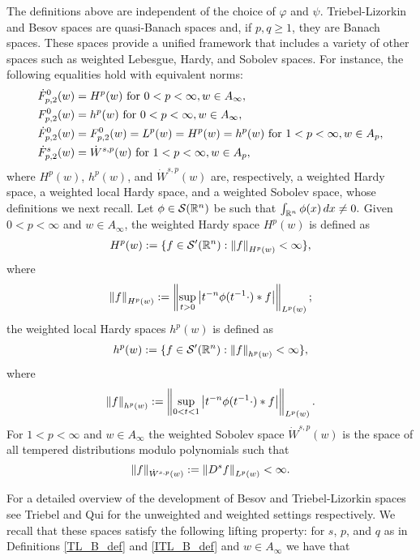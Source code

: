 The definitions above are independent of the choice of $\varphi$ and $\psi$. Triebel-Lizorkin and Besov spaces are quasi-Banach spaces and, if $p,q \geq 1$, they are Banach spaces. These spaces provide a unified framework that includes a variety of other spaces such as weighted Lebesgue, Hardy, and Sobolev spaces.  For instance, the following equalities hold with equivalent norms: 
\begin{align}
 \tlw{p}{0}{2}{w} &= H^p (w) \text{ for } 0<p<\infty,  w\in A_\infty, \label{TL_equal1} \\
 \itlw{p}{0}{2}{w}&= h^p(w) \text{ for } 0<p<\infty,  w\in A_\infty, \label{TL_equal2}  \\
  \tlw{p}{0}{2}{w} &= \itlw{p}{0}{2}{w} = L^p(w) = H^p(w) = h^p(w) \text{ for } 1<p<\infty,  w\in A_p, \label{TL_equal3} \\
 \tlw{p}{s}{2}{w} &= \dot{W}^{s,p}(w) \text{ for } 1<p<\infty,  w\in A_p,\label{TL_equal4}  
\end{align}
where $H^p(w)$, $h^p (w)$, and $\dot{W}^{s,p}(w)$ are, respectively, a weighted Hardy space, a weighted local Hardy space, and a weighted Sobolev space, whose definitions we next recall.
Let $\phi\in \sw$ be such that $\int_{\rn}\phi(x)\dx\neq 0.$ Given $0<p<\infty$ and $w\in A_\infty$, the weighted Hardy space $H^p(w)$ is defined as 
\begin{equation*}
H^p(w) :=\{f \in \swp: \norm{f}{H^p(w)}< \infty \},
\end{equation*}
where 
\[
\norm{f}{H^p(w)}:= \norm{\sup_{t>0} \abs{t^{-n}\phi(t^{-1}\cdot)\ast f}}{L^p(w)} ;
\]
the weighted local Hardy spaces $h^p(w)$ is defined as
\begin{equation*}\label{def:local_Hardy}
h^p(w) :=\{f \in \swp: \norm{f}{h^p(w)}< \infty \},
\end{equation*}
where 
\[
\norm{f}{h^p(w)}:= \norm{\sup_{0<t<1} \abs{t^{-n}\phi(t^{-1}\cdot)\ast f}}{L^p(w)} .
\]
For $1<p<\infty$ and $w\in A_\infty$ the weighted Sobolev space $\dot{W}^{s,p}(w)$ is the space of all tempered distributions modulo polynomials such that 
\[\norm{f}{\dot{W}^{s,p}(w)} := \norm{D^s f}{L^p(w)} < \infty. \]


For a detailed overview of the development of Besov and Triebel-Lizorkin spaces see Triebel \cite{MR3024598} and Qui \cite{MR676560} for the unweighted and weighted settings respectively. We recall that these spaces satisfy the following lifting property: for $s$, $p$, and $q$ as in Definitions \ref{TL_B_def} and \ref{ITL_B_def} and $w\in A_\infty$ we have that 

